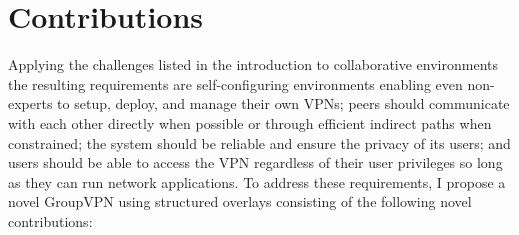 \section{Contributions}
Applying the challenges listed in the introduction to collaborative
environments the resulting requirements are self-configuring environments
enabling even non-experts to setup, deploy, and manage their own VPNs; peers
should communicate with each other directly when possible or through efficient
indirect paths when constrained; the system should be reliable and ensure the
privacy of its users; and users should be able to access the VPN regardless of
their user privileges so long as they can run network applications.  To address
these requirements, I propose a novel GroupVPN using structured overlays
consisting of the following novel contributions:

